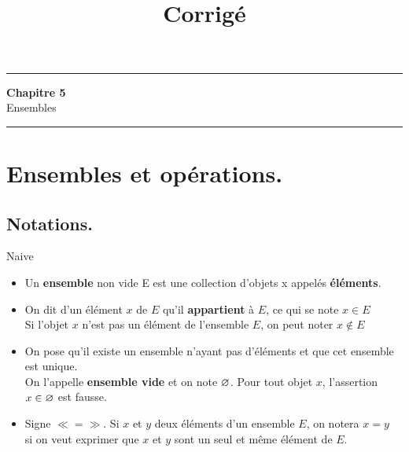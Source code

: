 \documentclass[11pt]{article}
\title{\bf{\pagetitle}\\\large{Corrigé}}
\def\pagetitle{Ensembles}
\begin{document}



\thispagestyle{fancy}
\fancyhead[C]{\pagetitle}

\hrule
\begin{center}
    \LARGE{\textbf{Chapitre 5}}\\
    \large{\pagetitle}\\
    \rule{0.8\textwidth}{0.5pt}
\end{center}


\vspace{0.5cm}

\section{Ensembles et opérations.}
\subsection{Notations.}

\begin{defi}{Naive}{}
    \begin{itemize}
        \item Un \textbf{ensemble} non vide E est une collection d'objets x appelés \textbf{éléments}.
        \item On dit d'un élément $x$ de $E$ qu'il \textbf{appartient} à $E$, ce qui se note $x \in E$\\
        Si l'objet $x$ n'est pas un élément de l'ensemble $E$, on peut noter $x \notin E$
        \item On pose qu'il existe un ensemble n'ayant pas d'éléments et que cet ensemble est unique.\\
        On l'appelle \textbf{ensemble vide} et on note $\varnothing$. Pour tout objet $x$, l'assertion $x \in \varnothing$ est fausse.
        \item Signe $\ll = \gg$. Si $x$ et $y$ deux éléments d'un ensemble $E$, on notera $x = y$ \\
        si on veut exprimer que $x$ et $y$ sont un seul et même élément de $E$.
    \end{itemize}
\end{defi}
\end{document}
